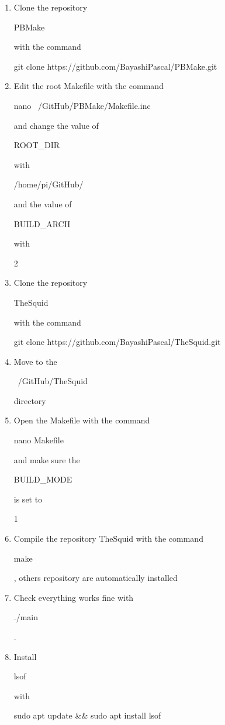 \begin{enumerate}
\item Clone the repository \begin{ttfamily}PBMake\end{ttfamily} with the command\\
\begin{ttfamily}git clone https://github.com/BayashiPascal/PBMake.git\end{ttfamily}
\item Edit the root Makefile with the command \begin{ttfamily}nano ~/GitHub/PBMake/Makefile.inc\end{ttfamily} and change the value of \begin{ttfamily}ROOT\_DIR\end{ttfamily} with \begin{ttfamily}/home/pi/GitHub/\end{ttfamily} and the value of \begin{ttfamily}BUILD\_ARCH\end{ttfamily} with \begin{ttfamily}2\end{ttfamily}
\item Clone the repository \begin{ttfamily}TheSquid\end{ttfamily} with the command\\
\begin{ttfamily}git clone https://github.com/BayashiPascal/TheSquid.git\end{ttfamily}
\item Move to the \begin{ttfamily}~/GitHub/TheSquid\end{ttfamily} directory
\item Open the Makefile with the command \begin{ttfamily}nano Makefile\end{ttfamily} and make sure the \begin{ttfamily}BUILD\_MODE\end{ttfamily} is set to \begin{ttfamily}1\end{ttfamily}
\item Compile the repository TheSquid with the command \begin{ttfamily}make\end{ttfamily}, others repository are automatically installed
\item Check everything works fine with \begin{ttfamily}./main\end{ttfamily}.
\item Install \begin{ttfamily}lsof\end{ttfamily} with \begin{ttfamily}sudo apt update \&\& sudo apt install lsof\end{ttfamily}
\end{enumerate}

